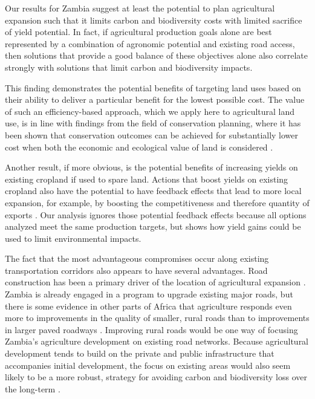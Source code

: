 \documentclass[a4paper]{article}
\begin{document}
{Our results for Zambia suggest at least the potential to plan agricultural expansion such that it limits carbon and biodiversity costs with limited sacrifice of yield potential.  In fact, if agricultural production goals alone are best represented by a combination of agronomic potential and existing road access, then solutions that provide a good balance of these objectives alone also correlate strongly with solutions that limit carbon and biodiversity impacts.  

This finding demonstrates the potential benefits of targeting land uses based on their ability to deliver a particular benefit for the lowest possible cost. The value of such an efficiency-based approach, which we apply here to agricultural land use, is in line with findings from the field of conservation planning, where it has been shown that conservation outcomes can be achieved for substantially lower cost when both the economic and ecological value of land is considered \citep[e.g.][]{naidoo_integrating_2006, polasky_where_2008}. 

Another result, if more obvious, is the potential benefits of increasing yields on existing cropland if used to spare land. Actions that boost yields on existing cropland also have the potential to have feedback effects that lead to more local expansion, for example, by boosting the competitiveness and therefore quantity of exports \cite{ewers_increases_2009,angelsen_policies_2010}. Our analysis ignores those potential feedback effects because all options analyzed meet the same production targets, but shows how yield gains could be used to limit environmental impacts. 

The fact that the most advantageous compromises occur along existing transportation corridors also appears to have several  advantages. Road construction has been a primary driver of the location of agricultural expansion \citep{laurance_impacts_2009}. Zambia is already engaged in a program to upgrade existing major roads, but there is some evidence in other parts of Africa that agriculture responds even more to improvements in the quality of smaller, rural roads than to improvements in larger paved roadways \citep{bourguignon_rural_2008,blimpo_public_2013}. Improving rural roads would be one way of focusing Zambia's agriculture development on existing road networks.  Because agricultural development tends to build on the private and public infrastructure that accompanies initial development, the focus on existing areas would also seem likely to be a more robust, strategy for avoiding carbon and biodiversity loss over the long-term \cite{laurance_estimating_2015}. 

}
\end{document}
